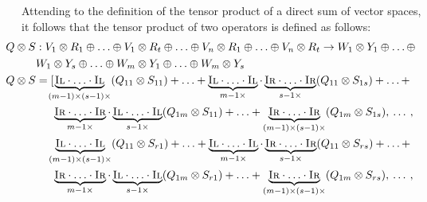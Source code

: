 Attending to the definition of the tensor product of a direct sum of vector spaces, it follows that the tensor product of two operators is defined as follows:
\begin{align*}
    \hspace{-20pt} Q \otimes S &:   V_1 \otimes R_1 \oplus \ldots \oplus V_1 \otimes R_t \oplus \ldots \oplus V_n \otimes R_1 \oplus \ldots \oplus V_n \otimes R_t \rightarrow W_1 \otimes Y_1 \oplus \ldots \oplus   \\
    \hspace{-20pt} & W_1 \otimes Y_s \oplus \ldots \oplus W_m \otimes Y_1 \oplus \ldots \oplus W_m \otimes Y_s \\
    \hspace{-20pt} Q \otimes S & =  [ \hspace{-5pt} \underbrace{\textsc{Il} \cdot \ldots \cdot \textsc{Il}}_{(m-1) \times ( s-1) \times} (Q_{11} \otimes S_{11}) + \ldots + \underbrace{\textsc{Il} \cdot \ldots \cdot \textsc{Il}}_{m-1 \times}\cdot \underbrace{\textsc{Ir} \cdot \ldots \cdot \textsc{Ir}}_{s-1  \times}  (Q_{11} \otimes S_{1s})  + \ldots +  \\
     & \hspace{15pt} \underbrace{\textsc{Ir} \cdot \ldots \cdot \textsc{Ir}}_{m-1  \times}  \cdot  \underbrace{\textsc{Il} \cdot \ldots \cdot \textsc{Il}}_{s-1 \times} (Q_{1m} \otimes S_{11})+ \ldots + \underbrace{\textsc{Ir} \cdot \ldots \cdot \textsc{Ir}}_{(m-1) \times (s-1) \times}(Q_{1m} \otimes S_{1s}), \hspace{2pt} \ldots \hspace{2pt},  \\
     & \hspace{10pt}\underbrace{\textsc{Il} \cdot \ldots \cdot \textsc{Il}}_{(m-1) \times ( s-1) \times} (Q_{11} \otimes S_{r1}) + \ldots + \underbrace{\textsc{Il} \cdot \ldots \cdot \textsc{Il}}_{m-1 \times}\cdot \underbrace{\textsc{Ir} \cdot \ldots \cdot \textsc{Ir}}_{s-1  \times}  (Q_{11} \otimes S_{rs})  + \ldots + \\
     & \hspace{15pt} \underbrace{\textsc{Ir} \cdot \ldots \cdot \textsc{Ir}}_{m-1  \times}  \cdot  \underbrace{\textsc{Il} \cdot \ldots \cdot \textsc{Il}}_{s-1 \times} (Q_{1m} \otimes S_{r1})+ \ldots + \underbrace{\textsc{Ir} \cdot \ldots \cdot \textsc{Ir}}_{(m-1) \times (s-1) \times}(Q_{1m} \otimes S_{rs}), \hspace{2pt} \ldots \hspace{2pt},  \\

\end{align*}
